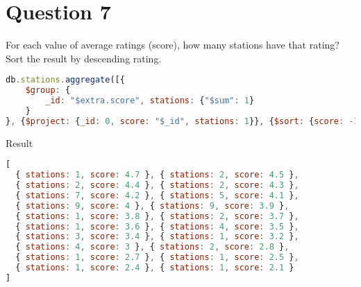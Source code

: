 \section{Question 7}

\begin{question}
  For each value of average ratings (score), how many stations have that
  rating? Sort the result by descending rating.
\end{question}

\begin{answer}

  \begin{lstlisting}[language=js]
db.stations.aggregate([{
    $group: {
        _id: "$extra.score", stations: {"$sum": 1}
    }
}, {$project: {_id: 0, score: "$_id", stations: 1}}, {$sort: {score: -1}}])
  \end{lstlisting}
  Result
  \begin{lstlisting}[language=js]
[
  { stations: 1, score: 4.7 }, { stations: 2, score: 4.5 },
  { stations: 2, score: 4.4 }, { stations: 2, score: 4.3 },
  { stations: 7, score: 4.2 }, { stations: 5, score: 4.1 },
  { stations: 9, score: 4 }, { stations: 9, score: 3.9 },
  { stations: 1, score: 3.8 }, { stations: 2, score: 3.7 },
  { stations: 1, score: 3.6 }, { stations: 4, score: 3.5 },
  { stations: 3, score: 3.4 }, { stations: 1, score: 3.2 },
  { stations: 4, score: 3 }, { stations: 2, score: 2.8 },
  { stations: 1, score: 2.7 }, { stations: 1, score: 2.5 },
  { stations: 1, score: 2.4 }, { stations: 1, score: 2.1 }
]
  \end{lstlisting}

\end{answer}
\pagebreak
